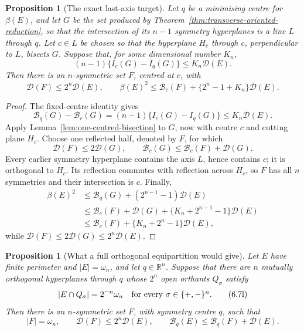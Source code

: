 \documentclass[11pt]{amsart}
\newtheorem{proposition}[theorem]{Proposition}
\theoremstyle{definition}
\newcommand{\R}{\mathbb R}
\newcommand{\Def}{\mathcal D}
\begin{document}
\begin{proposition}[The exact last-axis target]\label{prop:last-axis-target}
Let \(q\) be a minimising centre for \(\beta(E)\), and let \(G\) be
the set produced by Theorem~\ref{thm:transverse-oriented-reduction},
so that the intersection of its \(n-1\) symmetry hyperplanes is a
line \(L\) through \(q\).  Let \(c\in L\) be chosen so that the
hyperplane \(H_c\) through \(c\), perpendicular to \(L\), bisects
\(G\).  Suppose that, for some dimensional number \(K_n\),
\[
   (n-1)\bigl\{I_c(G)-I_q(G)\bigr\}
      \le K_n\Def(E).
\tag{6.7j}\label{eq:last-axis-potential-shift}
\]
Then there is an \(n\)-symmetric set \(F\), centred at \(c\), with
\[
   \Def(F)\le2^n\Def(E),
   \qquad
   \beta(E)^2
      \le \mathcal B_c(F)
           +\{2^n-1+K_n\}\Def(E).
\tag{6.7k}\label{eq:last-axis-output}
\]
\end{proposition}

\begin{proof}
The fixed-centre identity gives
\[
   \mathcal B_q(G)-\mathcal B_c(G)
      =(n-1)\{I_c(G)-I_q(G)\}
      \le K_n\Def(E).
\]
Apply Lemma~\ref{lem:one-centred-bisection} to \(G\), now with centre
\(c\) and cutting plane \(H_c\).  Choose one reflected half, denoted
by \(F\), for which
\[
   \Def(F)\le2\Def(G),
   \qquad
   \mathcal B_c(G)\le\mathcal B_c(F)+\Def(G).
\]
Every earlier symmetry hyperplane contains the axis \(L\), hence
contains \(c\); it is orthogonal to \(H_c\).  Its reflection commutes
with reflection across \(H_c\), so \(F\) has all \(n\) symmetries and
their intersection is \(c\).  Finally,
\[
\begin{aligned}
   \beta(E)^2
   &\le \mathcal B_q(G)+(2^{n-1}-1)\Def(E)\\
   &\le \mathcal B_c(F)+\Def(G)
        +\{K_n+2^{n-1}-1\}\Def(E)\\
   &\le \mathcal B_c(F)+\{K_n+2^n-1\}\Def(E),
\end{aligned}
\]
while \(\Def(F)\le2\Def(G)\le2^n\Def(E)\).
\end{proof}

\begin{proposition}[What a full orthogonal equipartition would give]
\label{prop:orthant-oriented-reduction}
Let \(E\) have finite perimeter and \(|E|=\omega_n\), and let
\(q\in\R^n\).  Suppose that there are \(n\) mutually orthogonal
hyperplanes through \(q\) whose \(2^n\) open orthants \(Q_\sigma\)
satisfy
\[
   |E\cap Q_\sigma|=2^{-n}\omega_n
   \quad\hbox{for every \(\sigma\in\{+,-\}^n\)}.
\tag{6.7l}\label{eq:orthant-equipartition}
\]
Then there is an \(n\)-symmetric set \(F\), with symmetry centre \(q\),
such that
\[
   |F|=\omega_n,\qquad
   \Def(F)\le2^n\Def(E),\qquad
   \mathcal B_q(E)\le\mathcal B_q(F)+\Def(E).
\tag{6.7m}\label{eq:full-orthant-output}
\]
\end{proposition}
\end{document}
